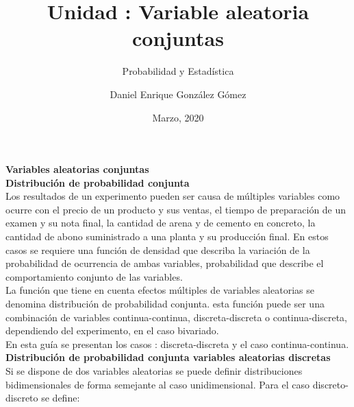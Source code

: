 \documentclass[base=hide,12pt]{elegantbook}
\title{Unidad : Variable aleatoria conjuntas}
\subtitle{Probabilidad y Estadística}
\author{Daniel Enrique González Gómez}
\institute{Pontificia Universidad Javeriana Cali}
\date{Marzo, 2020}
\begin{document}
\textcolor{col4}{\LARGE \bf Variables aleatorias conjuntas} \\

\vspace{.5cm} 
\textcolor{col4}{\large \bf Distribución de probabilidad conjunta}\\
Los resultados de un experimento pueden ser causa de múltiples variables como ocurre con el precio de un producto y sus ventas, el tiempo de preparación de un examen y su nota final, la cantidad de arena y de cemento en concreto, la cantidad de abono suministrado a una planta y su producción final. En estos casos se requiere una función de densidad que describa la variación de la probabilidad  de ocurrencia de ambas variables, probabilidad que describe el comportamiento conjunto de las variables. \\

La función que tiene en cuenta efectos múltiples de variables aleatorias se denomina distribución de probabilidad conjunta. esta función puede ser una combinación de variables continua-continua, discreta-discreta o continua-discreta, dependiendo del experimento, en el caso bivariado.\\

En esta guía se presentan los casos : discreta-discreta y el caso continua-continua. \\

\vspace{.5cm} 
\textcolor{col4}{\large \bf Distribución de probabilidad conjunta variables aleatorias discretas}\\
	
Si se dispone de dos variables aleatorias se puede definir distribuciones bidimensionales de forma semejante al caso unidimensional. Para el caso discreto-discreto se define:
\end{document}
